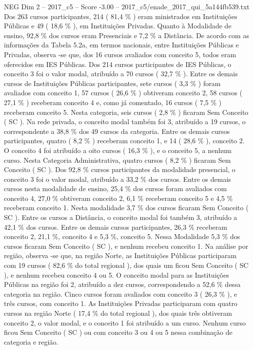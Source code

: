 \begin{textsample}{NEG Dim 2 – 2017\_c5 – Score -3.00 – 2017\_c5/enade\_2017\_qui\_5a144fb539.txt}
Dos 263 cursos participantes, 214 ( 81,4 \% ) eram ministrados em Instituições Públicas e 49 ( 18,6 \% ), em Instituições Privadas.
Quanto à Modalidade de ensino, 92,8 \% dos cursos eram Presenciais e 7,2 \% a Distância.
De acordo com as informações da Tabela 5.2a, em termos nacionais, entre Instituições Públicas e Privadas, observa -se que, dos 16 cursos avaliados com conceito 5, todos eram oferecidos em IES Públicas.
Dos 214 cursos participantes de IES Públicas, o conceito 3 foi o valor modal, atribuído a 70 cursos ( 32,7 \% ).
Entre os demais cursos de Instituições Públicas participantes, sete cursos ( 3,3 \% ) foram avaliados com conceito 1, 57 cursos ( 26,6 \% ) obtiveram conceito 2, 58 cursos ( 27,1 \% ) receberam conceito 4 e, como já comentado, 16 cursos ( 7,5 \% ) receberam conceito 5.
Nesta categoria, seis cursos ( 2,8 \% ) ficaram Sem Conceito ( SC ).
Na rede privada, o conceito modal também foi 3, atribuído a 19 cursos, o correspondente a 38,8 \% dos 49 cursos da categoria.
Entre os demais cursos participantes, quatro ( 8,2 \% ) receberam conceito 1, e 14 ( 28,6 \% ), conceito 2.
O conceito 4 foi atribuído a oito cursos ( 16,3 \% ), e o conceito 5, a nenhum curso.
Nesta Categoria Administrativa, quatro cursos ( 8,2 \% ) ficaram Sem Conceito ( SC ).
Dos 92,8 \% cursos participantes da modalidade presencial, o conceito 3 foi o valor modal, atribuído a 33,2 \% dos cursos.
Entre os demais cursos nesta modalidade de ensino, 25,4 \% dos cursos foram avaliados com conceito 4, 27,0 \% obtiveram conceito 2, 6,1 \% receberam conceito 5 e 4,5 \% receberam conceito 1.
Nesta modalidade 3,7 \% dos cursos ficaram Sem Conceito ( SC ).
Entre os cursos a Distância, o conceito modal foi também 3, atribuído a 42,1 \% dos cursos.
Entre os demais cursos participantes, 26,3 \% receberam conceito 2, 21,1 \%, conceito 4 e 5,3 \%, conceito 5.
Nessa Modalidade 5,3 \% dos cursos ficaram Sem Conceito ( SC ), e nenhum recebeu conceito 1.
Na análise por região, observa -se que, na região Norte, as Instituições Públicas participaram com 19 cursos ( 82,6 \% do total regional ), dos quais um ficou Sem Conceito ( SC ), e nenhum recebeu conceito 4 ou 5.
O conceito modal para as Instituições Públicas na região foi 2, atribuído a dez cursos, correspondendo a 52,6 \% dessa categoria na região.
Cinco cursos foram avaliados com conceito 3 ( 26,3 \% ), e três cursos, com conceito 1.
As Instituições Privadas participaram com quatro cursos na região Norte ( 17,4 \% do total regional ), dos quais três obtiveram conceito 2, o valor modal, e o conceito 1 foi atribuído a um curso.
Nenhum curso ficou Sem Conceito ( SC ) ou com conceito 3 ou 4 ou 5 nessa combinação de categoria e região.

\end{textsample}
